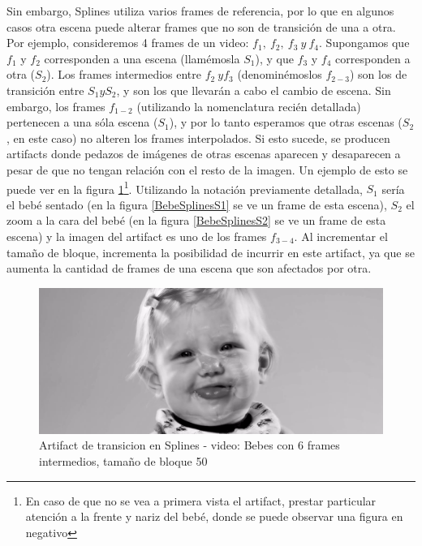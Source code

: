 \par Sin embargo, Splines utiliza varios frames de referencia, por lo que en algunos casos otra escena puede alterar frames que no son de transici\'on de una a otra.
Por ejemplo, consideremos 4 frames de un video: $f_1,\ f_2,\ f_3\ y\ f_4$.
Supongamos que $f_1$ y $f_2$ corresponden a una escena (llam\'emosla $S_1$), y que $f_3$ y $f_4$ corresponden a otra ($S_2$).
Los frames intermedios entre $f_2\ y f_3$ (denomin\'emoslos $f_{2-3}$) son los de transici\'on entre $S_1 y S_2$, y son los que llevar\'an a cabo el cambio de escena.
Sin embargo, los frames $f_{1-2}$ (utilizando la nomenclatura reci\'en detallada) pertenecen a una s\'ola escena ($S_1$), y por lo tanto esperamos que otras escenas ($S_2$, en este caso) no alteren los frames interpolados.
Si esto sucede, se producen artifacts donde pedazos de im\'agenes de otras escenas aparecen y desaparecen a pesar de que no tengan relaci\'on con el resto de la imagen.
Un ejemplo de esto se puede ver en la figura \ref{BebesSplinesArtifact}\footnote{En caso de que no se vea a primera vista el artifact, prestar particular atenci\'on a la frente y nariz del beb\'e, donde se puede observar una figura en negativo}.
Utilizando la notaci\'on previamente detallada, $S_1$ ser\'ia el beb\'e sentado (en la figura \ref{BebeSplinesS1} se ve un frame de esta escena), $S_2$ el zoom a la cara del beb\'e (en la figura \ref{BebeSplinesS2} se ve un frame de esta escena) y la imagen del artifact es uno de los frames $f_{3-4}$.
Al incrementar el tama\~no de bloque, incrementa la posibilidad de incurrir en este artifact, ya que se aumenta la cantidad de frames de una escena que son afectados por otra.

\FloatBarrier
\begin{figure}[h]
\begin{center}
\caption{Artifact de transicion en Splines - video: Bebes con 6 frames intermedios, tama\~no de bloque 50}
\label{BebesSplinesArtifact}
\includegraphics[width=0.9\columnwidth]{imagenes/cualitativos/BSA.png}
\end{center}
\end{figure}

